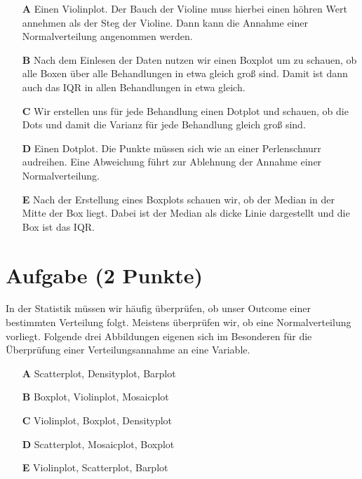 \documentclass[a4paper, 9pt]{scrartcl}\usepackage[]{graphicx}\usepackage[]{xcolor}
\begin{document}
\begin{enumerate}
\item [\textbf{A} \msquare] Einen Violinplot. Der Bauch der Violine muss hierbei einen höhren Wert annehmen als der Steg der Violine. Dann kann die Annahme einer Normalverteilung angenommen werden.
\item [\textbf{B} \msquare] Nach dem Einlesen der Daten nutzen wir einen Boxplot um zu schauen, ob alle Boxen über alle Behandlungen in etwa gleich groß sind. Damit ist dann auch das IQR in allen Behandlungen in etwa gleich.
\item [\textbf{C} \msquare] Wir erstellen uns für jede Behandlung einen Dotplot und schauen, ob die Dots und damit die Varianz für jede Behandlung gleich groß sind.
\item [\textbf{D} \msquare] Einen Dotplot. Die Punkte müssen sich wie an einer Perlenschnurr audreihen. Eine Abweichung führt zur Ablehnung der Annahme einer Normalverteilung.
\item [\textbf{E} \msquare] Nach der Erstellung eines Boxplots schauen wir, ob der Median in der Mitte der Box liegt. Dabei ist der Median als dicke Linie dargestellt und die Box ist das IQR.
\end{enumerate}

\section{Aufgabe \hfill (2 Punkte)}




In der Statistik müssen wir häufig überprüfen, ob unser Outcome einer bestimmten Verteilung folgt. Meistens überprüfen wir, ob eine
Normalverteilung vorliegt. Folgende drei Abbildungen eigenen sich im Besonderen für die Überprüfung einer Verteilungsannahme an eine Variable.





\begin{enumerate}
\item [\textbf{A} \msquare] Scatterplot, Densityplot, Barplot
\item [\textbf{B} \msquare] Boxplot, Violinplot, Mosaicplot
\item [\textbf{C} \msquare] Violinplot, Boxplot, Densityplot
\item [\textbf{D} \msquare] Scatterplot, Mosaicplot, Boxplot
\item [\textbf{E} \msquare] Violinplot, Scatterplot, Barplot
\end{enumerate} 
\end{document}

